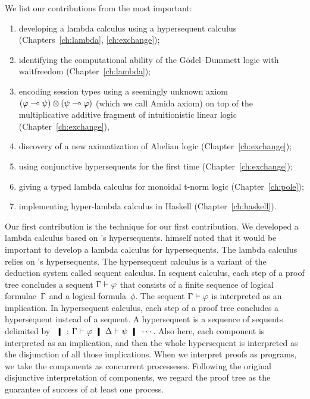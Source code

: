 We list our contributions from the most important:
\begin{enumerate}
 \item developing a lambda calculus using
       a hypersequent calculus (Chapters~\ref{ch:lambda}, \ref{ch:exchange});
 \item identifying the computational ability of the
       G\"odel--Dummett logic with waitfreedom (Chapter~\ref{ch:lambda});
 \item encoding session types using a seemingly unknown axiom
       $(\varphi\multimap \psi)\otimes(\psi\multimap \varphi)$ (which we call Amida axiom) on top
       of the multiplicative additive fragment of intuitionistic linear
       logic (Chapter~\ref{ch:exchange}),
 \item discovery of a new aximatization of Abelian logic (Chapter~\ref{ch:exchange});
 \item using conjunctive hypersequents for the first time
       (Chapter~\ref{ch:exchange});
 \item giving a typed lambda calculus for monoidal t-norm logic
       (Chapter~\ref{ch:pole});
 \item implementing hyper-lambda calculus in Haskell (Chapter~\ref{ch:haskell}).
\end{enumerate}

Our first contribution is the technique for our first contribution.
We developed a lambda calculus based on \citet{avron91}'s hypersequents.
\citet{avron91} himself noted that it would be important to develop a
lambda calculus for hypersequents.
The lambda calculus relies on \citet{avron91}'s hypersequents.
The hypersequent calculus is a
variant of the deduction system called sequent calculus.  In sequent
calculus, each step of a proof tree concludes a sequent $\Gamma\vdash\varphi$ that
consists of a finite sequence of logical formulae~$\Gamma$ and a logical
formula~$\phi$.  The sequent $\Gamma\vdash\varphi$ is
interpreted as an implication.  In hypersequent calculus, each step of a
proof tree concludes a hypersequent instead of a sequent.  A
hypersequent is a sequence of sequents delimited by $\hmid$:
$\G\vdash\phi\hmid \D\vdash\psi
\hmid \cdots$.  Also here, each component is interpreted as an
implication, and then the whole hypersequent is interpreted as the
disjunction of all those implications.
When we interpret proofs as programs, we take the components as
concurrent processeses.  Following the original disjunctive
interpretation of components, we regard the proof tree as the guarantee of
success of at least one process.

